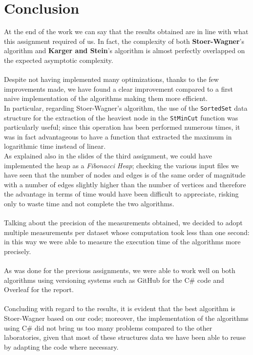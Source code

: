\section{Conclusion}

At the end of the work we can say that the results obtained are in line with what this assignment required of us. In fact, the complexity of both \textbf{Stoer-Wagner}'s algorithm and \textbf{Karger and Stein}'s algorithm is almost perfectly overlapped on the expected asymptotic complexity.\\ \\ \noindent
Despite not having implemented many optimizations, thanks to the few improvements made, we have found a clear improvement compared to a first naive implementation of the algorithms making them more efficient. \\  \noindent
In particular, regarding Stoer-Wagner's algorithm, the use of the \verb|SortedSet| data structure for the extraction of the heaviest node in the \verb|StMinCut| function was particularly useful; since this operation has been performed numerous times, it was in fact advantageous to have a function that extracted the maximum in logarithmic time instead of linear. \\ \noindent
As explained also in the slides of the third assignment, we could have implemented the heap as a \textit{Fibonacci Heap}; checking the various input files we have seen that the number of nodes and edges is of the same order of magnitude with a number of edges slightly higher than the number of vertices and therefore the advantage in terms of time would have been difficult to appreciate, risking only to waste time and not complete the two algorithms. \\ \\ \noindent
Talking about the precision of the measurements obtained, we decided to adopt multiple measurements per dataset whose computation took less than one second: in this way we were able to measure the execution time of the algorithms more precisely. \\ \\ \noindent
As was done for the previous assignments, we were able to work well on both algorithms using versioning systems such as GitHub for the C\# code and Overleaf for the report. \\ \\ \noindent
Concluding with regard to the results, it is evident that the best algorithm is Stoer-Wagner based on our code; moreover, the implementation of the algorithms using C\# did not bring us too many problems compared to the other laboratories, given that most of these structures data we have been able to reuse by adapting the code where necessary.